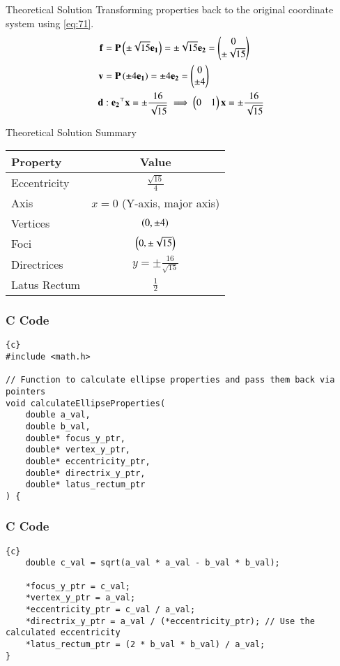 \documentclass{beamer}
\begin{document}
\begin{frame}{Theoretical Solution}
Transforming properties back to the original coordinate system using \eqref{eq:71}.
\begin{align}
    \mathbf{f} &= \mathbf{P}\left(\pm \sqrt{15}\mathbf{e_1}\right) = \pm \sqrt{15}\mathbf{e_2} = \begin{pmatrix}0 \\ \pm \sqrt{15}\end{pmatrix} \\
    \mathbf{v} &= \mathbf{P}\left(\pm 4\mathbf{e_1}\right) = \pm 4\mathbf{e_2} = \begin{pmatrix}0 \\ \pm 4\end{pmatrix} \\
    \mathbf{d} &: \mathbf{e_2}^\top\mathbf{x} = \pm \frac{16}{\sqrt{15}} \implies \begin{pmatrix}0 & 1\end{pmatrix}\mathbf{x} = \pm \frac{16}{\sqrt{15}}
\end{align}
\end{frame}

\begin{frame}{Theoretical Solution Summary}
\begin{center}
\begin{tabular}{|l|c|}
    \hline
    \textbf{Property} & \textbf{Value} \\
    \hline
    Eccentricity & $\frac{\sqrt{15}}{4}$ \\
    \hline
    Axis & $x=0$ (Y-axis, major axis) \\
    \hline
    Vertices & $\left(0, \pm 4\right)$ \\
    \hline
    Foci & $\left(0, \pm \sqrt{15}\right)$ \\
    \hline
    Directrices & $y = \pm \frac{16}{\sqrt{15}}$ \\
    \hline
    Latus Rectum & $\frac{1}{2}$ \\
    \hline
\end{tabular}
\end{center}
\end{frame}

\begin{frame}[fragile]
\frametitle{C Code}
\begin{lstlisting}{c}
#include <math.h>

// Function to calculate ellipse properties and pass them back via pointers
void calculateEllipseProperties(
    double a_val,
    double b_val,
    double* focus_y_ptr,
    double* vertex_y_ptr,
    double* eccentricity_ptr,
    double* directrix_y_ptr,
    double* latus_rectum_ptr
) {
\end{lstlisting}
\end{frame}

\begin{frame}[fragile]
\frametitle{C Code}
\begin{lstlisting}{c}
    double c_val = sqrt(a_val * a_val - b_val * b_val);

    *focus_y_ptr = c_val;
    *vertex_y_ptr = a_val;
    *eccentricity_ptr = c_val / a_val;
    *directrix_y_ptr = a_val / (*eccentricity_ptr); // Use the calculated eccentricity
    *latus_rectum_ptr = (2 * b_val * b_val) / a_val;
}
\end{lstlisting}
\end{frame}
\end{document}
